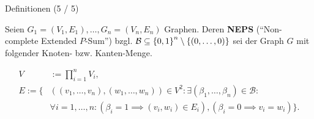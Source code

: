 \documentclass[aspectratio=169]{beamer}
\begin{document}
\begin{frame}{Definitionen (5 / 5)}

    \begin{definition*}[NEPS]

        Seien $G_1 = (V_1, E_1), \dots, G_n = (V_n, E_n)$ Graphen. Deren \textbf{NEPS} (\enquote{Non-complete Extended $P$-Sum}) bzgl. $\mathcal B \subseteq {\left \{ 0, 1 \right \}}^n \setminus {\left \{ (0, \dots, 0) \right \}}$ sei der Graph $G$ mit folgender Knoten- bzw. Kanten-Menge.
    
        \begin{align*}
            V & := \prod_{i=1}^n V_i, \\
            E
            :=
            \{ &
                ((v_1, \dots, v_n), (w_1, \dots, w_n)) \in V^2:
                \exists (\beta_1, \dots, \beta_n) \in \mathcal B: \\ &
                    \forall i = 1, \dots, n:
                        (\beta_i = 1 \implies (v_i, w_i) \in E_i),
                        (\beta_i = 0 \implies v_i = w_i)
            \}.
        \end{align*}

    \end{definition*}
    

\end{frame}
\end{document}
